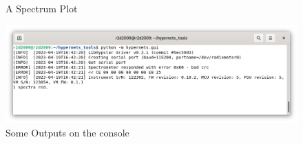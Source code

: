 \begin{figure}[!ht]
\begin{minipage}[b]{0.48\textwidth}
	\vspace{-15pt}
	\caption{A Spectrum Plot}
	\label{fig:spectrumPlot}
  \end{minipage}
	\vspace{15pt}
	\vspace{15pt}
	\vspace{15pt}
  \begin{minipage}[b]{\textwidth}
	  \includegraphics[width=\linewidth]{images/gui_console.png}
	\vspace{-15pt}
	\caption{Some Outputs on the console}
	\label{fig:spectrumPlot}
  \end{minipage}
\end{figure}

\clearpage
\newpage

